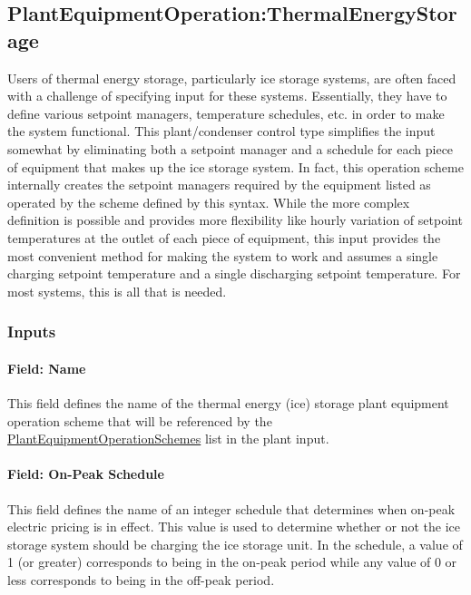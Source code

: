 \subsection{PlantEquipmentOperation:ThermalEnergyStorage}\label{plantequipmentoperationthermalenergystorage}

Users of thermal energy storage, particularly ice storage systems, are often faced with a challenge of specifying input for these systems. Essentially, they have to define various setpoint managers, temperature schedules, etc. in order to make the system functional. This plant/condenser control type simplifies the input somewhat by eliminating both a setpoint manager and a schedule for each piece of equipment that makes up the ice storage system. In fact, this operation scheme internally creates the setpoint managers required by the equipment listed as operated by the scheme defined by this syntax. While the more complex definition is possible and provides more flexibility like hourly variation of setpoint temperatures at the outlet of each piece of equipment, this input provides the most convenient method for making the system to work and assumes a single charging setpoint temperature and a single discharging setpoint temperature. For most systems, this is all that is needed.

\subsubsection{Inputs}\label{inputs-13-009}

\paragraph{Field: Name}\label{field-name-7-013}

This field defines the name of the thermal energy (ice) storage plant equipment operation scheme that will be referenced by the \hyperref[plantequipmentoperationschemes]{PlantEquipmentOperationSchemes} list in the plant input.

\paragraph{Field: On-Peak Schedule}\label{field-on-peak-schedule}

This field defines the name of an integer schedule that determines when on-peak electric pricing is in effect. This value is used to determine whether or not the ice storage system should be charging the ice storage unit. In the schedule, a value of 1 (or greater) corresponds to being in the on-peak period while any value of 0 or less corresponds to being in the off-peak period.

